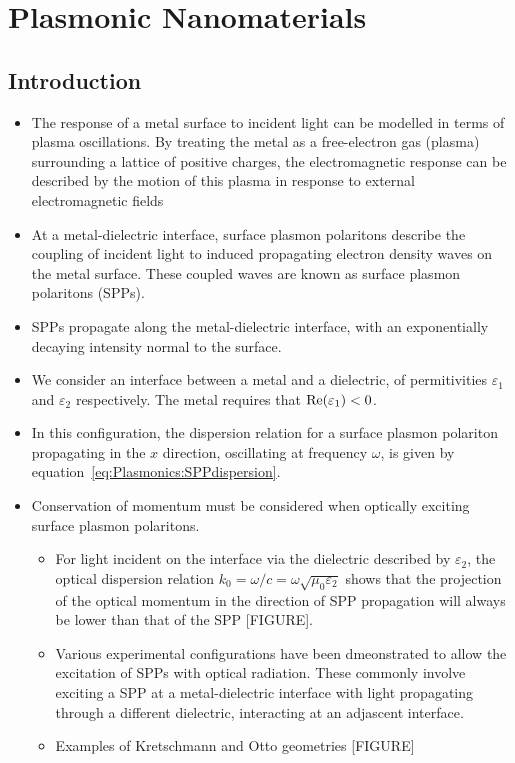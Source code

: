 \chapter{Plasmonic Nanomaterials}\label{sec:background:Plasmonics}

\section{Introduction}
\begin{itemize}
    \item The response of a metal surface to incident light can be modelled in terms of plasma oscillations. By treating the metal as a free-electron gas (plasma) surrounding a lattice of positive charges, the electromagnetic response can be described by the motion of this plasma in response to external electromagnetic fields
    \item At a metal-dielectric interface, surface plasmon polaritons describe the coupling of incident light to induced propagating electron density waves on the metal surface. These coupled waves are known as surface plasmon polaritons (SPPs).
    \item SPPs propagate along the metal-dielectric interface, with an exponentially decaying intensity normal to the surface.
    \item We consider an interface between a metal and a dielectric, of permitivities $\varepsilon_1$ and $\varepsilon_2$ respectively. The metal requires that ${\mathop{\rm Re}\nolimits}(\varepsilon_1)<0$.
    \item In this configuration, the dispersion relation for a surface plasmon polariton propagating in the $x$ direction, oscillating at frequency $\omega$, is given by equation~\ref{eq:Plasmonics:SPPdispersion}.
    \item Conservation of momentum must be considered when optically exciting surface plasmon polaritons.
    \begin{itemize}
        \item For light incident on the interface via the dielectric described by $\varepsilon_2$, the optical dispersion relation $k_0 = \omega / c = \omega \sqrt{\mu_0 \varepsilon_2}$ shows that the projection of the optical momentum in the direction of SPP propagation will always be lower than that of the SPP [FIGURE].
        \item Various experimental configurations have been dmeonstrated to allow the excitation of SPPs with optical radiation. These commonly involve exciting a SPP at a metal-dielectric interface with light propagating through a different dielectric, interacting at an adjascent interface.
        \item Examples of Kretschmann and Otto geometries [FIGURE]
    \end{itemize}
\end{itemize}

